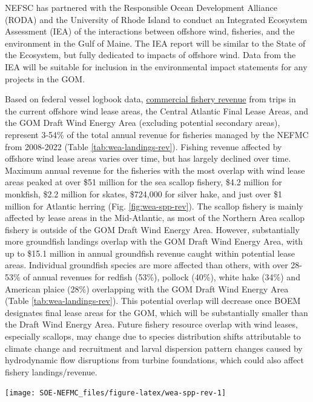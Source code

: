 \documentclass[
  10pt,
]{article}
\let\origfigure\figure
\let\endorigfigure\endfigure
\renewenvironment{figure}[1][2] {
    \expandafter\origfigure\expandafter[H]
} {
    \endorigfigure
}
\begin{document}
NEFSC has partnered with the Responsible Ocean Development Alliance (RODA) and the University of Rhode Island to conduct an Integrated Ecosystem Assessment (IEA) of the interactions between offshore wind, fisheries, and the environment in the Gulf of Maine. The IEA report will be similar to the State of the Ecosystem, but fully dedicated to impacts of offshore wind. Data from the IEA will be suitable for inclusion in the environmental impact statements for any projects in the GOM.

Based on federal vessel logbook data, \href{https://noaa-edab.github.io/catalog/fishery-impacts-from-offshore-wind-development.html}{commercial fishery revenue} from trips in the current offshore wind lease areas, the Central Atlantic Final Lease Areas, and the GOM Draft Wind Energy Area (excluding potential secondary areas), represent 3-54\% of the total annual revenue for fisheries managed by the NEFMC from 2008-2022 (Table \ref{tab:wea-landings-rev}). Fishing revenue affected by offshore wind lease areas varies over time, but has largely declined over time. Maximum annual revenue for the fisheries with the most overlap with wind lease areas peaked at over \$51 million for the sea scallop fishery, \$4.2 million for monkfish, \$2.2 million for skates, \$724,000 for silver hake, and just over \$1 million for Atlantic herring (Fig. \ref{fig:wea-spp-rev}). The scallop fishery is mainly affected by lease areas in the Mid-Atlantic, as most of the Northern Area scallop fishery is outside of the GOM Draft Wind Energy Area. However, substantially more groundfish landings overlap with the GOM Draft Wind Energy Area, with up to \$15.1 million in annual groundfish revenue caught within potential lease areas. Individual groundfish species are more affected than others, with over 28-53\% of annual revenues for redfish (53\%), pollock (40\%), white hake (34\%) and American plaice (28\%) overlapping with the GOM Draft Wind Energy Area (Table \ref{tab:wea-landings-rev}). This potential overlap will decrease once BOEM designates final lease areas for the GOM, which will be substantially smaller than the Draft Wind Energy Area. Future fishery resource overlap with wind leases, especially scallops, may change due to species distribution shifts attributable to climate change and recruitment and larval dispersion pattern changes caused by hydrodynamic flow disruptions from turbine foundations, which could also affect fishery landings/revenue.

\begin{figure}

{\centering \texttt{[image: SOE-NEFMC\_files/figure-latex/wea-spp-rev-1]} 

}

\caption{Fishery revenues from NEFMC managed species in the Wind energy lease areas.}\label{fig:wea-spp-rev}
\end{figure}
\end{document}
